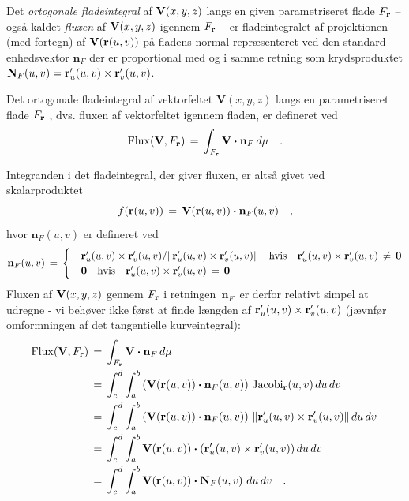 Det {\em{orto\-gonale fladeintegral}} af ${\bf
V}(x,y,z)$ langs en given parametriseret flade $F_{\bf r}$ -- også kaldet  \emph{fluxen} af ${\bf
V}(x,y,z)$ igennem $F_{\bf r}$ --  er
fladeintegralet af projektionen (med fortegn) af ${\bf V}({\bf
r}(u,v))$ på fladens normal repræsenteret ved den standard enhedsvektor ${\mathbf{n}}_{F}$
der er proportional med og i samme retning som krydsproduktet
$\mathbf{N}_{F}(u,v) = {\bf r}'_{u}(u,v)\times {\bf r}'_{v}(u,v)$.

\begin{definition} \label{defFlux}
Det ortogonale fladeintegral af vektorfeltet $\mathbf{V}(x,y,z)$ langs en parametriseret flade $F_{\bf r}$ , dvs.
fluxen af vektorfeltet igennem fladen,
er defineret ved
\begin{equation}
\operatorname{Flux}({\bf V}, F_{\bf r})\, = \,
\int_{F_{\bf r}}{\bf V} \bm{\cdot} {\mathbf{n}}_{F}\,d\mu \quad .
\end{equation}
\end{definition}

Integranden  i det
fladeintegral, der giver fluxen,  er altså givet ved skalarproduktet
\begin{equation}
f({\bf r}(u,v)) \, = \, {\bf V}({\bf r}(u,v)) \bm{\cdot} {\mathbf{n}}_{F}(u,v)
\quad ,
\end{equation}
hvor ${\mathbf{n}}_{F}(u,v)$ er defineret ved
\begin{equation}
{\mathbf{n}}_{F}(u,v)\, = \,
\begin{cases}
&{\bf r}'_{u}(u,v)\times{\bf r}'_{v}(u,v)/ \Vert {\bf
r}'_{u}(u,v)\times{\bf r}'_{v}(u,v) \Vert  \quad \text{hvis}\quad {\bf
r}'_{u}(u,v)\times{\bf r}'_{v}(u,v)\, \neq \,
{\bf 0} \\
&{\bf 0} \quad \text{hvis} \quad {\bf r}'_{u}(u,v)\times{\bf
r}'_{v}(u,v)\, = \, {\bf 0}
\end{cases}
\end{equation}
Fluxen af ${\bf V}(x,y,z)$ gennem $F_{\bf r}$ i
retningen $\,{\mathbf{n}}_{F}\,$ er derfor relativt
simpel at udregne - vi behøver ikke først at
finde længden af ${\bf r}'_{u}(u,v)\times{\bf
r}'_{v}(u,v)$ (jævnfør omformningen af det
tangentielle kurveintegral):
\begin{equation} \label{eqOrt}
\begin{aligned}
\operatorname{Flux}({\bf V}, F_{\bf r})\,&= \,
\int_{F_{\bf r}}{\bf V}\bm{\cdot} {\mathbf{n}}_{F}\,d\mu \,  \,\\
&= \, \int_{c}^{d}\int_{a}^{b}\left({\bf V}({\bf r}(u,v))\bm{\cdot} {\mathbf{n}}_{F}(u,v)\right) \,
 \operatorname{Jacobi}_{{\bf r}}(u,v)\,du \, dv \,\\
 &= \, \int_{c}^{d}\int_{a}^{b}\left({\bf
V}({\bf r}(u,v))\bm{\cdot} {\mathbf{n}}_{F}(u,v)\right) \,  \Vert {\bf
r}'_{u}(u,v)\times{\bf
r}'_{v}(u,v) \Vert \,du \, dv \,\\
 &=
\, \int_{c}^{d}\int_{a}^{b}{\bf V}({\bf r}(u,v))\bm{\cdot} ({\bf
r}'_{u}(u,v)\times{\bf r}'_{v}(u,v))\,du \, dv  \\
&= \, \int_{c}^{d}\int_{a}^{b}{\bf V}({\bf r}(u,v)) \bm{\cdot} \mathbf{N}_{F}(u,v) \,\,du \, dv  \quad .
\end{aligned}
\end{equation}

